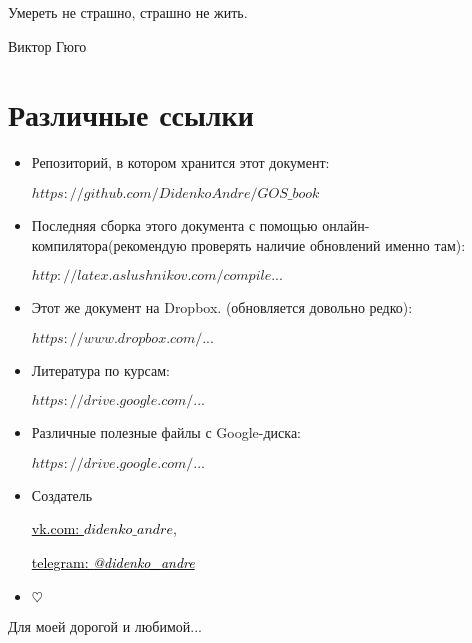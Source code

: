 \epigraph{Умереть не страшно, страшно не жить.}{Виктор Гюго}

{\let\clearpage\relax\chapter{Различные ссылки}}
\begin{itemize}
\item

Репозиторий, в котором хранится этот документ:

\href{https://github.com/DidenkoAndre/GOS_book}{$https://github.com/DidenkoAndre/GOS\_book$}

\item
Последняя сборка этого документа с помощью онлайн-компилятора\newline (рекомендую проверять наличие обновлений именно там): 

\href{http://latex.aslushnikov.com/compile?git=https://github.com/DidenkoAndre/GOS_book&target=_main.tex}{$http://latex.aslushnikov.com/compile...$}

\item

Этот же документ на Dropbox.  \newline (обновляется довольно редко):

\href{https://www.dropbox.com/sh/7e5mfj8q68o2ipp/AAD8XvpZhiJzFbEh_IeH305ia?dl=0&preview=GOSBook.pdf}{$https://www.dropbox.com/...$}

\item
Литература по курсам:

\href{https://drive.google.com/drive/u/0/folders/0BzuzEyNkpwYDcENXcV9jNWdwVlU}{$https://drive.google.com/...$}

\item
Различные полезные файлы с Google-диска:

\href{https://drive.google.com/drive/u/0/folders/0BzuzEyNkpwYDYjVNcE0wa3hqWjA}{$https://drive.google.com/...$}

\item
Создатель

\href{https://vk.com/didenko_andre}{\textcolor{black}{vk.com: \textcolor{Purplemountainmajesty}{$didenko\_andre$}}},

\href{https://telegram.me/didenko_andre}{\textcolor{black}{telegram: \textcolor{Purplemountainmajesty}{\textit{@didenko_andre}}}}

\item

$\heartsuit$
\end{itemize}

\newpage
\epigraph{Для моей дорогой и любимой...}{}

